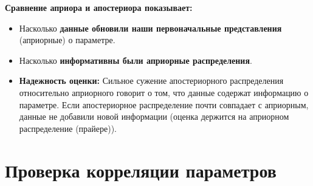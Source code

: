 \documentclass[
  letterpaper,
  DIV=11,
  numbers=noendperiod]{scrreprt}
\begin{document}
\textbf{Сравнение априора и апостериора показывает:}

\begin{itemize}
\item
  Насколько \textbf{данные обновили наши первоначальные представления}
  (априорные) о параметре.
\item
  Насколько \textbf{информативны были априорные распределения}.
\item
  \textbf{Надежность оценки:} Сильное сужение апостериорного
  распределения относительно априорного говорит о том, что данные
  содержат информацию о параметре. Если апостериорное распределение
  почти совпадает с априорным, данные не добавили новой информации
  (оценка держится на априорном распределение (прайере)).
\end{itemize}

\section{Проверка корреляции
параметров}\label{ux43fux440ux43eux432ux435ux440ux43aux430-ux43aux43eux440ux440ux435ux43bux44fux446ux438ux438-ux43fux430ux440ux430ux43cux435ux442ux440ux43eux432}
\end{document}
